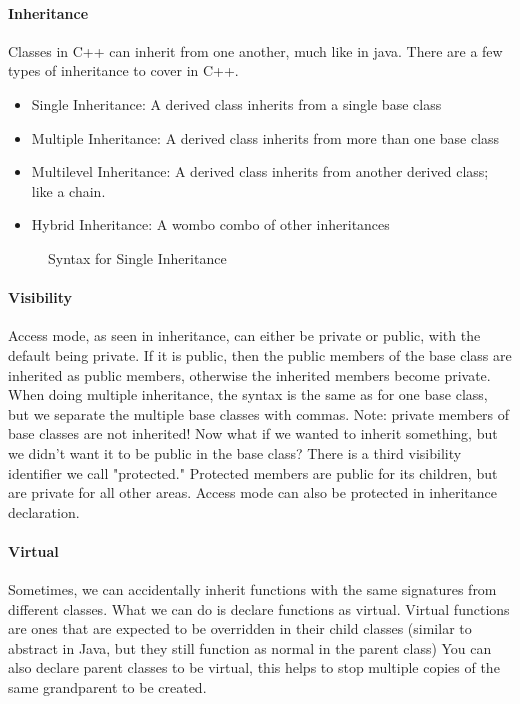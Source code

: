 \paragraph{Inheritance} Classes in C++ can inherit from one another, much like in java. There are a few types of inheritance to cover in C++.
\begin{itemize}
	\item Single Inheritance: A derived class inherits from a single base class
	\item Multiple Inheritance: A derived class inherits from more than one base class
	\item Multilevel Inheritance: A derived class inherits from another derived class; like a chain.
	\item Hybrid Inheritance: A wombo combo of other inheritances
\end{itemize}
\begin{figure}[!htb]
	\caption{\label{fig:inheritance} Syntax for Single Inheritance}
\end{figure}
\paragraph{Visibility} Access mode, as seen in \figurename{inheritance}, can either be private or public, with the default being private. If it is public, then the public members of the base class are inherited as public members, otherwise the inherited members become private. When doing multiple inheritance, the syntax is the same as for one base class, but we separate the multiple base classes with commas. Note: private members of base classes are not inherited! \newline
Now what if we wanted to inherit something, but we didn't want it to be public in the base class? There is a third visibility identifier we call "protected." Protected members are public for its children, but are private for all other areas. Access mode can also be protected in inheritance declaration. 
\paragraph{Virtual} Sometimes, we can accidentally inherit functions with the same signatures from different classes. What we can do is declare functions as virtual. Virtual functions are ones that are expected to be overridden in their child classes (similar to abstract in Java, but they still function as normal in the parent class) You can also declare parent classes to be virtual, this helps to stop multiple copies of the same grandparent to be created.

